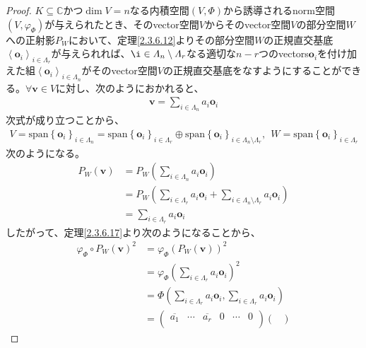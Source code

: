 \documentclass[dvipdfmx]{jsarticle}
\begin{document}
\begin{proof}
$K \subseteq \mathbb{C}$かつ$\dim V = n$なる内積空間$(V,\varPhi )$から誘導されるnorm空間$\left( V,\varphi_{\varPhi } \right)$が与えられたとき、そのvector空間$V$からそのvector空間$V$の部分空間$W$への正射影$P_{W}$において、定理\ref{2.3.6.12}よりその部分空間$W$の正規直交基底$\left\langle \mathbf{o}_{i} \right\rangle_{i \in \varLambda_{r}}$が与えられれば、$\i \in \varLambda_{n} \setminus \varLambda_{r}$なる適切な$n - r$つのvectors$\mathbf{o}_{i}$を付け加えた組$\left\langle \mathbf{o}_{i} \right\rangle_{i \in \varLambda_{n}}$がそのvector空間$V$の正規直交基底をなすようにすることができる。$\forall\mathbf{v} \in V$に対し、次のようにおかれると、
\begin{align*}
\mathbf{v} = \sum_{i \in \varLambda_{n}} {a_{i}\mathbf{o}_{i}}
\end{align*}
次式が成り立つことから、
\begin{align*}
V = \mathrm{span}\left\{ \mathbf{o}_{i} \right\}_{i \in \varLambda_{n}} = \mathrm{span}\left\{ \mathbf{o}_{i} \right\}_{i \in \varLambda_{r}} \oplus \mathrm{span}\left\{ \mathbf{o}_{i} \right\}_{i \in \varLambda_{n} \setminus \varLambda_{r}},\ \ W = \mathrm{span}\left\{ \mathbf{o}_{i} \right\}_{i \in \varLambda_{r}}
\end{align*}
次のようになる。
\begin{align*}
P_{W}\left( \mathbf{v} \right) &= P_{W}\left( \sum_{i \in \varLambda_{n}} {a_{i}\mathbf{o}_{i}} \right)\\
&= P_{W}\left( \sum_{i \in \varLambda_{r}} {a_{i}\mathbf{o}_{i}} + \sum_{i \in \varLambda_{n} \setminus \varLambda_{r}} {a_{i}\mathbf{o}_{i}} \right)\\
&= \sum_{i \in \varLambda_{r}} {a_{i}\mathbf{o}_{i}}
\end{align*}
したがって、定理\ref{2.3.6.17}より次のようになることから、
\begin{align*}
{\varphi_{\varPhi } \circ P_{W}\left( \mathbf{v} \right)}^{2} &= {\varphi_{\varPhi }\left( P_{W}\left( \mathbf{v} \right) \right)}^{2}\\
&= {\varphi_{\varPhi }\left( \sum_{i \in \varLambda_{r}} {a_{i}\mathbf{o}_{i}} \right)}^{2}\\
&= \varPhi \left( \sum_{i \in \varLambda_{r}} {a_{i}\mathbf{o}_{i}},\sum_{i \in \varLambda_{r}} {a_{i}\mathbf{o}_{i}} \right)\\
&= \begin{pmatrix}
\overline{a_{1}} & \cdots & \overline{a_{r}} & 0 & \cdots & 0 \\
\end{pmatrix}\begin{pmatrix}

\end{pmatrix}
\end{align*}
\end{proof}
\end{document}
